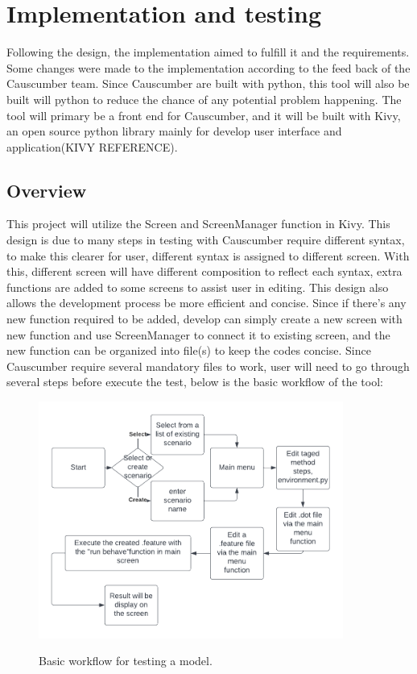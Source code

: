 \chapter{Implementation and testing}
Following the design, the implementation aimed to fulfill it and the requirements. Some changes were made to the implementation according to the feed back of the Causcumber team. Since Causcumber are built with python, this tool will also be built will python to reduce the chance of any potential problem happening. The tool will primary be a front end for Causcumber, and it will be built with Kivy, an open source python library mainly for develop user interface and application(KIVY REFERENCE). 

\section{Overview}
This project will utilize the Screen and ScreenManager function in Kivy. This design is due to many steps in testing with Causcumber require different syntax, to make this clearer for user, different syntax is assigned to different screen. With this, different screen will have different composition to reflect each syntax, extra functions are added to some screens to assist user in editing. This design also allows the development process be more efficient and concise. Since if there’s any new function required to be added, develop can simply create a new screen with new function and use ScreenManager to connect it to existing screen, and the new function can be organized into file(s) to keep the codes concise. Since Causcumber require several mandatory files to work, user will need to go through several steps before execute the test, below is the basic workflow of the tool:
\begin{figure}[H]
	\centering
	\includegraphics[width=10cm]{figures/workFlow.png}\\
	\caption{Basic workflow for testing a model.}
	\label{fig:figure9}
\end{figure}


